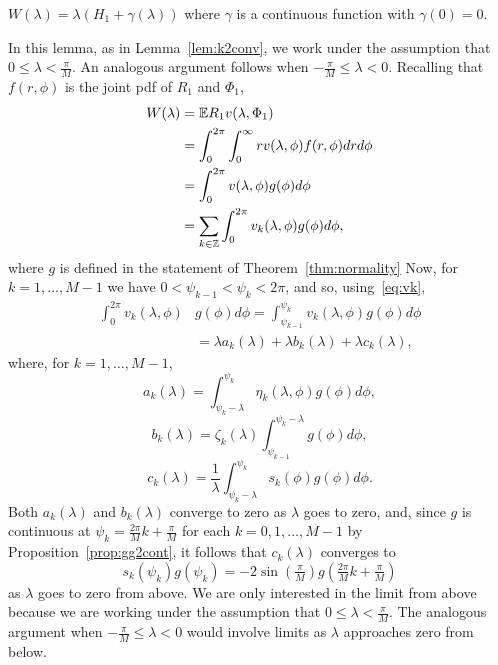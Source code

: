 \documentclass[journal]{IEEEtran}
\begin{document}
\begin{lemma}\label{lem:expRvlamphi}
$W(\lambda) =  \lambda(H_1 + \gamma(\lambda))$ where $\gamma$ is a continuous function with $\gamma(0) = 0$.
\end{lemma}
\begin{IEEEproof}
In this lemma, as in Lemma~\ref{lem:k2conv}, we work under the assumption that $0 \leq \lambda < \frac{\pi}{M}$.  An analogous argument follows when $-\tfrac{\pi}{M} \leq \lambda < 0$.  Recalling that $f(r,\phi)$ is the joint pdf of $R_1$ and $\Phi_1$, 
\begin{align}
W(\lambda) &= {\mathbb E} R_1 v(\lambda, \Phi_1) \nonumber  \\
&= \int_0^{2\pi}\int_{0}^\infty r v(\lambda, \phi) f(r,\phi) dr d\phi \nonumber  \\ 
&= \int_0^{2\pi} v(\lambda, \phi) g(\phi) d\phi \nonumber \\
&= \sum_{k \in {\mathbb Z}} \int_0^{2\pi} v_k(\lambda, \phi) g(\phi) d\phi, \label{eq:Winfsum}
\end{align}
where $g$ is defined in the statement of Theorem~\ref{thm:normality}
Now, for $k = 1, \dots, M-1$ we have $0 < \psi_{k-1} < \psi_k < 2\pi$, and so, using~\eqref{eq:vk},
\begin{align*}
\int_0^{2\pi} v_k(\lambda, \phi) &g(\phi) d\phi = \int_{\psi_{k-1}}^{\psi_{k}} v_k(\lambda, \phi) g(\phi) d\phi \\
&= \lambda a_k(\lambda) + \lambda b_k(\lambda) + \lambda c_k(\lambda),
\end{align*}
where, for $k = 1, \dots, M-1$,
\begin{equation}\label{eq:ak}
a_k(\lambda) = \int_{\psi_k-\lambda}^{\psi_k}\eta_k(\lambda, \phi) g(\phi) d\phi,
\end{equation}
\[
b_k(\lambda) = \zeta_k(\lambda) \int_{\psi_{k-1}}^{\psi_k -\lambda}g(\phi) d\phi,
\]
\begin{equation}\label{eq:ck}
c_k(\lambda) = \frac{1}{\lambda} \int_{\psi_{k} - \lambda}^{\psi_{k}} s_k(\phi) g(\phi) d\phi.
\end{equation}
Both $a_k(\lambda)$ and $b_k(\lambda)$ converge to zero as $\lambda$ goes to zero, and, since $g$ is continuous at $\psi_k = \tfrac{2\pi}{M}k + \tfrac{\pi}{M}$ for each $k = 0, 1, \dots, M-1$ by Proposition~\ref{prop:gg2cont}, it follows that $c_k(\lambda)$ converges to 
\[
s_k(\psi_k)g(\psi_k) = -2\sin(\tfrac{\pi}{M}) g(\tfrac{2\pi}{M}k + \tfrac{\pi}{M})
\]
as $\lambda$ goes to zero from above.  We are only interested in the limit from above because we are working under the assumption that $0 \leq \lambda < \frac{\pi}{M}$.  The analogous argument when $-\tfrac{\pi}{M} \leq \lambda < 0$ would involve limits as $\lambda$ approaches zero from below.


\end{IEEEproof}
\end{document}
